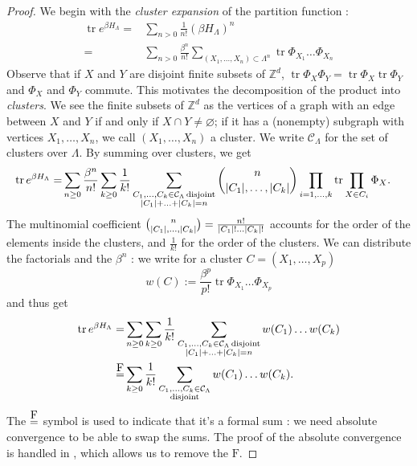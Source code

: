 \documentclass[french]{article}
\DeclarePairedDelimiter\abs{\lvert}{\rvert}
\DeclareMathOperator{\disj}{disjoint}
\DeclareMathOperator{\tr}{tr}
\newcommand\formeq{\stackrel{\mathclap{\normalfont\mbox{F}}}{=}}
\begin{document}
 \begin{proof}
     We begin with the {\it cluster expansion} of the partition function :
     \begin{align*}
         \tr e^{\beta H_\Lambda}=&\sum_{n>0}\frac{1}{n!}(\beta H_\Lambda)^n\\
         =&\sum_{n>0}\frac{\beta^n}{n!}\sum_{(X_1,\ldots, X_n)\subset \Lambda^n}\tr\Phi_{X_1}\ldots\Phi_{X_n}
     \end{align*}
     Observe that if $X$ and $Y$ are disjoint finite subsets of $\mathbb Z^d$, $\tr \Phi_X\Phi_Y=\tr \Phi_X \tr\Phi_Y$ and $\Phi_X$ and $\Phi_Y$ commute.
    This motivates the decomposition of the product into {\it clusters}.
    We see the finite subsets of $\mathbb Z^d$ as the vertices of a graph with an edge between $X$ and $Y$ if and only if $X\cap Y\neq \varnothing$; if it has a (nonempty) subgraph with vertices $X_1,\ldots,X_n$, we call $(X_1,\ldots,X_n)$ a cluster.
    We write $\mathcal C_\Lambda$ for the set of clusters over $\Lambda$.
    By summing over clusters, we get 
    \begin{align*}
        \tr e^{\beta H_\Lambda}=&\sum_{n\geq0}\frac {\beta^n} {n!} \sum_{k\geq 0}\frac{1}{k!}\sum_{\substack{C_1,\ldots,C_k\in\mathcal C_\Lambda \disj\\\abs{C_1}+\ldots+\abs{C_k}=n}}\binom{n}{\abs{C_1},\ldots,\abs{C_k}}\prod_{i=1,\ldots,k}\tr\prod_{X\in C_i}\Phi_X.
    \end{align*}
    The multinomial coefficient $\binom{n}{\abs{C_1},\ldots,\abs{C_k}}=\frac{n!}{\abs{C_1}!\ldots\abs{C_k}!}$ accounts for the order of the elements inside the clusters, and $\frac{1}{k!}$ for the order of the clusters.
    We can distribute the factorials and the $\beta^n$ : we write for a cluster $C=(X_1,\ldots,X_p)$
    $$
    w(C):=\frac {\beta^p}{p!}\tr \Phi_{X_1}\ldots\Phi_{X_p}
    $$
    and thus get 
    \begin{align*}
        \tr e^{\beta H_\Lambda}=&\sum_{n\geq0}\sum_{k\geq 0}\frac 1{k!}\sum_{\substack{C_1,\ldots,C_k\in\mathcal C_\Lambda \disj\\\abs{C_1}+\ldots+\abs{C_k}=n}}w(C_1)\ldots w(C_k)\\
        \formeq&\sum_{k\geq 0}\frac 1{k!} \sum_{\substack{C_1,\ldots,C_k\in\mathcal C_\Lambda\\\disj}}w(C_1)\ldots w(C_k).
    \end{align*}
    The $\formeq$ symbol is used to indicate that it’s a formal sum : we need absolute convergence to be able to swap the sums. 
    The proof of the absolute convergence is handled in \cite{friedliChapterClusterExpansion2017}, which allows us to remove the $\text{F}$.
    

\end{proof}
\end{document}
